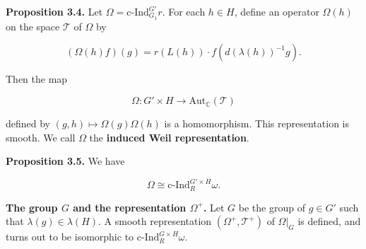 \documentclass[12pt]{article}
\begin{document}
\textbf{Proposition 3.4.} Let $\Omega = \text{c-Ind}_{G_{1}}^{G'} r$. For each
$h \in H$, define an operator $\Omega\left(h\right)$ on the space $\mathcal{T}$
of $\Omega$ by 

\[\left(\Omega\left(h\right)f\right)\left(g\right) =
r\left(L\left(h\right)\right) \cdot
f\left(d\left(\lambda\left(h\right)\right)^{-1}g\right).\]

Then the map 

\[\Omega : G' \times H \rightarrow \text{Aut}_{\mathbb{C}}\left(\mathcal{T}\right)\]

defined by $\left(g, h\right) \mapsto \Omega\left(g\right)\Omega\left(h\right)$
is a homomorphism. This representation is smooth. We call $\Omega$ the
\textbf{induced Weil representation}.

\textbf{Proposition 3.5.} We have 

\[\Omega \cong \text{c-Ind}_{R}^{G' \times H} \omega.\]

\textbf{The group $G$ and the representation $\Omega^{+}$.} Let $G$ be the group
of $g \in G'$ such that $\lambda\left(g\right) \in \lambda\left(H\right)$. A
smooth representation $\left(\Omega^{+}, \mathcal{T}^{+}\right)$ of
$\Omega|_{G}$ is defined, and turns out to be isomorphic to $\text{c-Ind}_{R}^{G
\times H} \omega$.
\end{document}
